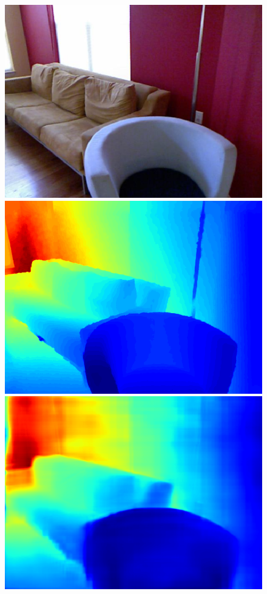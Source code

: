 \documentclass{svjour3}                     %
\begin{document}
\begin{figure}[t]
{\begin{minipage}[t]{0.15\linewidth}
  \includegraphics[width=1\linewidth]{images/nyu_rgb/1313.png}
  \includegraphics[width=1\linewidth]{images/nyu_gt/1313.png}
  \includegraphics[width=1\linewidth]{images/nyu_result/living_room_rgb_01313.png}

\end{minipage}}
\end{figure}
\end{document}
